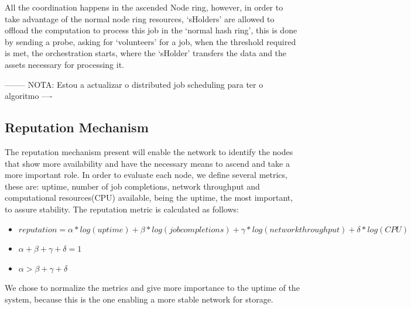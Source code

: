 All the coordination happens in the ascended Node ring, however, in order to take advantage of the normal node ring resources, `sHolders' are allowed to offload the computation to process this job in the `normal hash ring', this is done by sending a probe, asking for `volunteers' for a job, when the threshold required is met, the orchestration starts, where the `sHolder' transfers the data and the assets necessary for processing it.


--------
NOTA:
Estou a actualizar o distributed job scheduling para ter o algoritmo
----






\subsection{Reputation Mechanism}

The reputation mechanism present will enable the network to identify the nodes that show more availability and have the necessary means to ascend and take a more important role. In order to evaluate each node, we define several metrics, these are: uptime, number of job completions, network throughput and computational resources(CPU) available, being the uptime, the most important, to assure stability. The reputation metric is calculated as follows:

\begin{itemize}
  \item $reputation = \alpha * log(uptime) + \beta * log(job completions) + \gamma * log(network throughput) + \delta * log (CPU)$ 
  \item $\alpha+ \beta+ \gamma+ \delta = 1$
  \item $\alpha > \beta + \gamma + \delta$
\end{itemize}

We chose to normalize the metrics and give more importance to the uptime of the system, because this is the one enabling a more stable network for storage.


